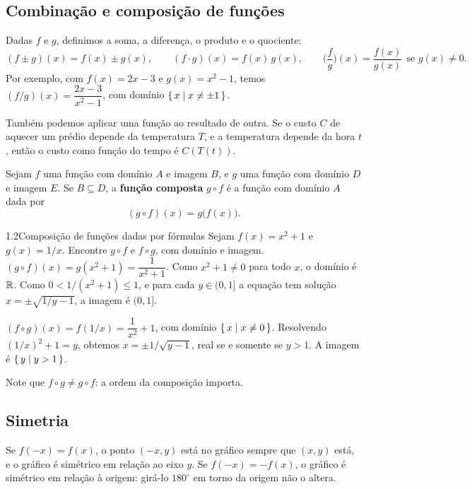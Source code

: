 \subsection{Combinação e composição de funções}

Dadas $f$ e $g$, definimos a soma, a diferença, o produto e o quociente:
\[
(f\pm g)(x)=f(x)\pm g(x),\qquad (f\cdot g)(x)=f(x)\,g(x),\qquad
\Big(\frac fg\Big)(x)=\frac{f(x)}{g(x)}\ \ \text{se } g(x)\neq0 .
\]
Por exemplo, com $f(x)=2x-3$ e $g(x)=x^2-1$, temos $(f/g)(x)=\dfrac{2x-3}{x^2-1}$, com
domínio $\{\,x \mid x\neq\pm1\,\}$.

Também podemos aplicar uma função ao resultado de outra. Se o custo $C$ de aquecer um
prédio depende da temperatura $T$, e a temperatura depende da hora $t$, então o custo como
função do tempo é $C(T(t))$.

\begin{definicao}
Sejam $f$ uma função com domínio $A$ e imagem $B$, e $g$ uma função com domínio $D$ e
imagem $E$. Se $B\subseteq D$, a \textbf{função composta} $g\circ f$ é a função com
domínio $A$ dada por
\[
(g\circ f)(x)=g\big(f(x)\big).
\]
\end{definicao}

\begin{exemplo}{1.2}{Composição de funções dadas por fórmulas}
Sejam $f(x)=x^2+1$ e $g(x)=1/x$. Encontre $g\circ f$ e $f\circ g$, com domínio e imagem.
\solucao
$(g\circ f)(x)=g(x^2+1)=\dfrac{1}{x^2+1}$. Como $x^2+1\neq0$ para todo $x$, o domínio é
$\mathbb{R}$. Como $0<1/(x^2+1)\le1$, e para cada $y\in(0,1]$ a equação tem solução
$x=\pm\sqrt{1/y-1}$, a imagem é $(0,1]$.

$(f\circ g)(x)=f(1/x)=\dfrac{1}{x^2}+1$, com domínio $\{\,x \mid x\neq0\,\}$. Resolvendo
$(1/x)^2+1=y$, obtemos $x=\pm1/\sqrt{y-1}$, real se e somente se $y>1$. A imagem é
$\{\,y \mid y>1\,\}$.

Note que $f\circ g\neq g\circ f$: a ordem da composição importa.
\end{exemplo}

\subsection{Simetria}

Se $f(-x)=f(x)$, o ponto $(-x,y)$ está no gráfico sempre que $(x,y)$ está, e o gráfico é
simétrico em relação ao eixo $y$. Se $f(-x)=-f(x)$, o gráfico é simétrico em relação à
origem: girá-lo $180^\circ$ em torno da origem não o altera.

